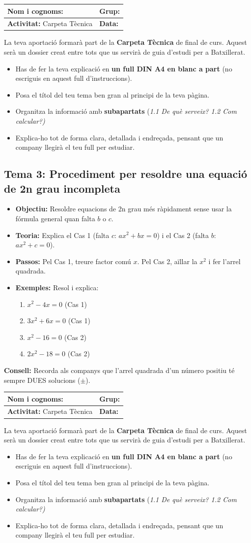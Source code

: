 \documentclass[12pt,a4paper]{article}
\newcommand{\introcomuna}{
    \begin{tcolorbox}[colback=gray!5,colframe=gray!50!black,title=\textbf{La Carpeta Tècnica de Matemàtiques}]
    La teva aportació formarà part de la \textbf{Carpeta Tècnica} de final de curs. Aquest serà un dossier creat entre tots que us servirà de guia d'estudi per a Batxillerat.
    
    \begin{itemize}[label=\textbullet, leftmargin=*]
        \item Has de fer la teva explicació en \textbf{un full DIN A4 en blanc a part} (no escriguis en aquest full d'instruccions).
        \item Posa el títol del teu tema ben gran al principi de la teva pàgina.
        \item Organitza la informació amb \textbf{subapartats} (\textit{1.1 De què serveix? 1.2 Com calcular?)}
        \item Explica-ho tot de forma clara, detallada i endreçada, pensant que un company llegirà el teu full per estudiar.
    \end{itemize}
    \end{tcolorbox}
    \vspace{0.1cm}
}
\newcommand{\capcaleraalumne}[1]{
    \begingroup
    \renewcommand{\arraystretch}{2.2}
    \begin{tabularx}{\textwidth}{|X|p{4cm}|}
    \hline
    \textbf{Nom i cognoms:} & \textbf{Grup:} \\ \hline
    \textbf{Activitat:} Carpeta Tècnica & \textbf{Data:} \\ \hline
    \end{tabularx}
    \endgroup
    \vspace{0.4cm}
}
\begin{document}
\newpage
\capcaleraalumne{3}
\introcomuna
\subsection*{Tema 3: Procediment per resoldre una equació de 2n grau incompleta}
\begin{itemize}[label=\textbullet]
    \item \textbf{Objectiu:} Resoldre equacions de 2n grau més ràpidament sense usar la fórmula general quan falta $b$ o $c$.
    \item \textbf{Teoria:} Explica el Cas 1 (falta $c$: $ax^2+bx=0$) i el Cas 2 (falta $b$: $ax^2+c=0$).
    \item \textbf{Passos:} Pel Cas 1, treure factor comú $x$. Pel Cas 2, aïllar la $x^2$ i fer l'arrel quadrada.
    \item \textbf{Exemples:} Resol i explica:
    \begin{enumerate}[label=\alph*)]
        \item $x^2 - 4x = 0$ \quad (Cas 1)
        \item $3x^2 + 6x = 0$ \quad (Cas 1)
        \item $x^2 - 16 = 0$ \quad (Cas 2)
        \item $2x^2 - 18 = 0$ \quad (Cas 2)
    \end{enumerate}
\end{itemize}
\vfill
\noindent\textbf{Consell:} Recorda als companys que l'arrel quadrada d'un número positiu té sempre DUES solucions ($\pm$).

\newpage
\capcaleraalumne{4}
\introcomuna
\end{document}
